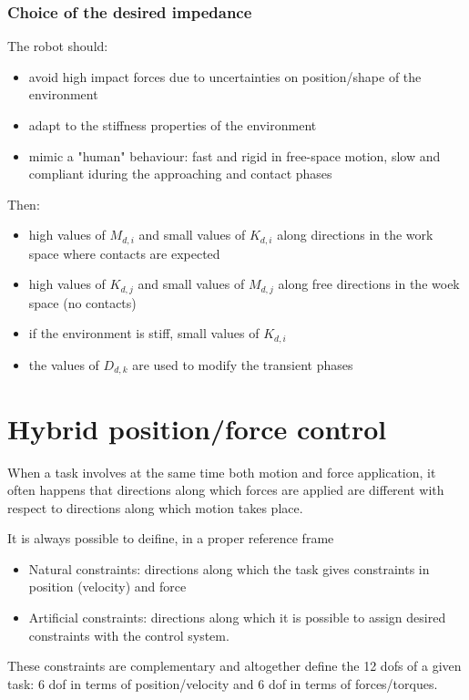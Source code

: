 \documentclass{book}
\begin{document}
\subsubsection{Choice of the desired impedance}
The robot should:
\begin{itemize}
    \item avoid high impact forces due to uncertainties on position/shape of the environment 
    \item adapt to the stiffness properties of the environment 
    \item mimic a "human" behaviour: fast and rigid in free-space motion, slow and compliant iduring the approaching and contact phases 
\end{itemize}
Then:
\begin{itemize}
    \item high values of $M_{d,i}$ and small values of $K_{d,i}$ along directions in the work space where contacts are expected 
    \item high values of $K_{d,j}$ and small values of $M_{d,j}$ along free directions in the woek space (no contacts) 
    \item if the environment is stiff, small values of $K_{d,i}$ 
    \item the values of $D_{d,k}$ are used to modify the transient phases
\end{itemize}

\section{Hybrid position/force control}
When a task involves at the same time both motion and force application, it often happens that directions along which forces are applied are different with respect to directions along which motion takes place.

It is always possible to deifine, in a proper reference frame 
\begin{itemize}
    \item Natural constraints: directions along which the task gives constraints in position (velocity) and force 
    \item Artificial constraints: directions along which it is possible to assign desired constraints with the control system. 
\end{itemize}
These constraints are complementary and altogether define the 12 dofs of a given task: 6 dof in terms of position/velocity and 6 dof in terms of forces/torques. 
\end{document}
